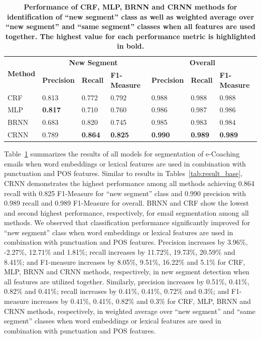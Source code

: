 \documentclass{amia}
\begin{document}
\begin{table}[ht]
\centering
\caption{\textbf{Performance of CRF, MLP, BRNN and CRNN methods for identification of ``new segment'' class as well as weighted average over ``new segment'' and ``same segment'' classes when all features are used together. The highest value for each performance metric
is highlighted in bold.}}
\label{tab:result_weighted_avg}
 \begin{tabular}{|l|l|l|l|l|l|l|}
  \hline
   \multirow{2}{*}{\textbf{Method}} & \multicolumn{3}{|c|}{\textbf{New Segment}} & \multicolumn{3}{|c|}{\textbf{Overall}} \\\cline{2-7}
   & \textbf{Precision}  & \textbf{Recall} & \textbf{F1-Measure} & \textbf{Precision}  & \textbf{Recall} & \textbf{F1-Measure} \\ \hline    
 CRF & 0.813 & 0.772 & 0.792 & 0.988 & 0.988 & 0.988 \\ \hline
 MLP & \textbf{0.817} & 0.710 & 0.760 & 0.986 & 0.987 & 0.986 \\ \hline
 BRNN & 0.683 & 0.820 & 0.745 & 0.985 & 0.983 & 0.984 \\ \hline
 CRNN & 0.789 & \textbf{0.864} & \textbf{0.825} & \textbf{0.990} & \textbf{0.989} & \textbf{0.989} \\ \hline
  \end{tabular}
\end{table}      

Table~\ref{tab:result_weighted_avg} summarizes the results of all models for segmentation of e-Coaching emails when word embeddings or lexical features are used in combination with punctuation and POS features. Similar to results in Tables~\ref{tab:result_base}, CRNN demonstrates the highest performance among all methods achieving 0.864 recall with 0.825 F1-Measure for ``new segment'' class and 0.990 precision with 0.989 recall and 0.989 F1-Measure for overall. BRNN and CRF show the lowest and second highest performance, respectively, for email segmentation among all methods. We observed that classification performance significantly improved for ``new segment'' class when word embeddings or lexical features are used in combination with punctuation and POS features. Precision increases by 3.96\%, -2.27\%, 12.71\% and 1.81\%; recall increases by 11.72\%, 19.73\%, 20.59\% and 8.41\%; and F1-measure increases by 8.05\%, 9.51\%, 16.22\% and 5.1\% for CRF, MLP, BRNN and CRNN methods, respectively, in new segment detection when all features are utilized together. Similarly, precision increases by 0.51\%, 0.41\%, 0.82\% and 0.41\%; recall increases by 0.41\%, 0.41\%, 0.72\% and 0.3\%; and F1-measure increases by 0.41\%, 0.41\%, 0.82\% and 0.3\% for CRF, MLP, BRNN and CRNN methods, respectively, in weighted average over ``new segment'' and ``same segment'' classes when word embeddings or lexical features are used in combination with punctuation and POS features.\\
\end{document}
